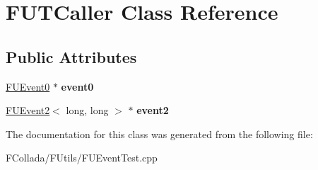 \hypertarget{classFUTCaller}{
\section{FUTCaller Class Reference}
\label{classFUTCaller}
}
\subsection*{Public Attributes}
\begin{DoxyCompactItemize}
\item 
\hypertarget{classFUTCaller_a70a7a1f4801ac0484b83a6fec5b9a496}{
\hyperlink{classFUEvent0}{FUEvent0} $\ast$ {\bfseries event0}}
\label{classFUTCaller_a70a7a1f4801ac0484b83a6fec5b9a496}

\item 
\hypertarget{classFUTCaller_a2ac0acda1d660ebaa37db09b656d1690}{
\hyperlink{classFUEvent2}{FUEvent2}$<$ long, long $>$ $\ast$ {\bfseries event2}}
\label{classFUTCaller_a2ac0acda1d660ebaa37db09b656d1690}

\end{DoxyCompactItemize}


The documentation for this class was generated from the following file:\begin{DoxyCompactItemize}
\item 
FCollada/FUtils/FUEventTest.cpp\end{DoxyCompactItemize}
